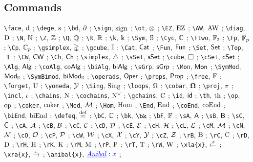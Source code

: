 \subsection*{Commands} 

\verb|\face|, $\operatorname{d}$ ; 
\verb|\dege|, $\operatorname{s}$ ; 
\verb|\bd|, $\operatorname{\partial}$ ; 
\verb|\sign|, $\operatorname{sign}$ ; 
\verb|\ot|, $\otimes$ ; 
\verb|\EZ|, $\operatorname{EZ}$ ; 
\verb|\AW|, $\operatorname{AW}$ ; 
\verb|\diag|, $\mathrm{D}$ ; 
\verb|\N|, $\mathbb{N}$ ; 
\verb|\Z|, $\mathbb{Z}$ ; 
\verb|\Q|, $\mathbb{Q}$ ; 
\verb|\R|, $\mathbb{R}$ ; 
\verb|\k|, $\Bbbk$ ; 
\verb|\Sym|, $\mathbb{S}$ ; 
\verb|\Cyc|, $\mathbb{C}$ ; 
\verb|\Ftwo|, ${\mathbb{F}_2}$ ; 
\verb|\Fp|, ${\mathbb{F}_p}$ ; 
\verb|\Cp|, ${\mathbb{C}_p}$ ; 
\verb|\gsimplex|, $\mathbb{\Delta}$ ; 
\verb|\gcube|, $\mathbb{I}$ ; 
\verb|\Cat|, $\mathsf{Cat}$ ; 
\verb|\Fun|, $\mathsf{Fun}$ ; 
\verb|\Set|, $\mathsf{Set}$ ; 
\verb|\Top|, $\Top$ ; 
\verb|\CW|, $\mathsf{CW}$ ; 
\verb|\Ch|, $\mathsf{Ch}$ ; 
\verb|\simplex|, $\triangle$ ; 
\verb|\sSet|, $\mathsf{sSet}$ ; 
\verb|\cube|, $\square$ ; 
\verb|\cSet|, $\mathsf{cSet}$ ; 
\verb|\Alg|, $\mathsf{Alg}$ ; 
\verb|\coAlg|, $\mathsf{coAlg}$ ; 
\verb|\biAlg|, $\mathsf{biAlg}$ ; 
\verb|\sGrp|, $\mathsf{sGrp}$ ; 
\verb|\Mon|, $\mathsf{Mon}$ ; 
\verb|\SymMod|, $\mathsf{Mod}_{\mathbb{S}}$ ; 
\verb|\SymBimod|, $\mathsf{biMod}_{\mathbb{S}}$ ; 
\verb|\operads|, $\mathsf{Oper}$ ; 
\verb|\props|, $\mathsf{Prop}$ ; 
\verb|\free|, $\operatorname{F}$ ; 
\verb|\forget|, $\operatorname{U}$ ; 
\verb|\yoneda|, $\operatorname{\mathcal{Y}}$ ; 
\verb|\Sing|, $\operatorname{Sing}$ ; 
\verb|\loops|, $\Omega$ ; 
\verb|\cobar|, $\operatorname{\mathbf{\Omega}}$ ; 
\verb|\proj|, $\operatorname{\pi}$ ; 
\verb|\incl|, $\operatorname{\iota}$ ; 
\verb|\chains|, $\operatorname{N}$ ; 
\verb|\cochains|, $\operatorname{N^{\vee}}$ ; 
\verb|\gchains|, $\operatorname{C}$ ; 
\verb|\id|, $\mathsf{id}$ ; 
\verb|\th|, $\mathrm{th}$ ; 
\verb|\op|, $\mathrm{op}$ ; 
\verb|\coker|, $\operatorname{coker}$ ; 
\verb|\Med|, $\operatorname{\mathcal{M}}$ ; 
\verb|\Hom|, $\mathrm{Hom}$ ; 
\verb|\End|, $\mathrm{End}$ ; 
\verb|\coEnd|, $\mathrm{coEnd}$ ; 
\verb|\biEnd|, $\mathrm{biEnd}$ ; 
\verb|\defeq|, $\stackrel{\mathrm{def}}{=}$ ; 
\verb|\bC|, $\mathbb{C}$ ; 
\verb|\bk|, $\bk$ ; 
\verb|\bF|, $\mathbb{F}$ ; 
\verb|\sA|, $\mathsf{A}$ ; 
\verb|\sB|, $\mathsf{B}$ ; 
\verb|\sC|, $\mathsf{C}$ ; 
\verb|\cA|, $\mathcal{A}$ ; 
\verb|\cB|, $\mathcal{B}$ ; 
\verb|\cC|, $\mathcal{C}$ ; 
\verb|\cD|, $\mathcal{D}$ ; 
\verb|\cE|, $\mathcal{E}$ ; 
\verb|\cH|, $\mathcal{H}$ ; 
\verb|\cL|, $\mathcal{L}$ ; 
\verb|\cM|, $\mathcal{M}$ ; 
\verb|\cN|, $\mathcal{N}$ ; 
\verb|\cO|, $\mathcal{O}$ ; 
\verb|\cP|, $\mathcal{P}$ ; 
\verb|\cW|, $\mathcal{W}$ ; 
\verb|\cX|, $\mathcal{X}$ ; 
\verb|\cY|, $\mathcal{Y}$ ; 
\verb|\cZ|, $\mathcal{Z}$ ; 
\verb|\rB|, $\mathrm{B}$ ; 
\verb|\rC|, $\mathrm{C}$ ; 
\verb|\rD|, $\mathrm{D}$ ; 
\verb|\rH|, $\mathrm{H}$ ; 
\verb|\rK|, $\mathrm{K}$ ; 
\verb|\rM|, $\mathrm{M}$ ; 
\verb|\rP|, $\mathrm{P}$ ; 
\verb|\rT|, $\mathrm{T}$ ; 
\verb|\rW|, $\mathrm{W}$ ; 
\verb|\xla{x}|, $\xleftarrow{x}$ ; 
\verb|\xra{x}|, $\xrightarrow{x}$ ; 
\verb|\anibal{x}|, $\textcolor{blue}{\underline{Anibal}: x}$ ; 
